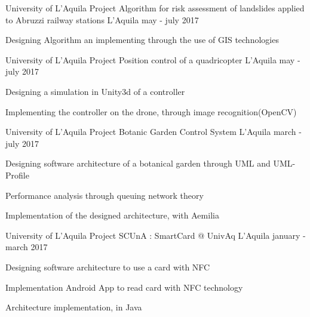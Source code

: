 


\begin{cventries}



\cventry
{University of L'Aquila Project}%
{Algorithm for risk assessment of landslides applied to Abruzzi railway stations} %
{L'Aquila} %
{may - july 2017} %
{ %
	\begin{cvitems}
		\item {Designing Algorithm an implementing through the use of GIS technologies}
	\end{cvitems}
}

\cventry
{University of L'Aquila Project}%
{Position control of a quadricopter} %
{L'Aquila} %
{may - july 2017} %
{ %
	\begin{cvitems}
		\item {Designing a simulation in Unity3d of a controller}
		\item {Implementing the controller on the drone, through image recognition(OpenCV)}
	\end{cvitems}
}

\cventry
{University of L'Aquila Project} %
{Botanic Garden Control System} %
{L'Aquila} %
{march - july 2017} %
{ %
	\begin{cvitems}
		\item {Designing software architecture of a botanical garden through UML and UML-Profile}
		\item {Performance analysis through queuing network theory}
		\item {Implementation of the designed architecture, with Aemilia}
	\end{cvitems}
}

\cventry
{University of L'Aquila Project} %
{SCUnA : SmartCard @ UnivAq} %
{L'Aquila} %
{january - march 2017} %
{ %
	\begin{cvitems}
		\item {Designing software architecture to use a card with NFC}
		\item {Implementation Android App to read card with NFC technology}
		\item {Architecture implementation, in Java}
	\end{cvitems}
}


\end{cventries}
